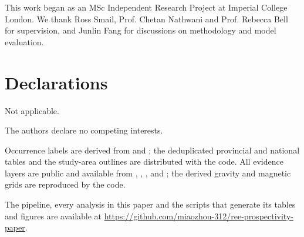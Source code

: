 \documentclass[pdflatex,sn-apa]{sn-jnl}
\begin{document}
\backmatter

This work began as an MSc Independent Research Project at Imperial College London. We thank Ross Smail, Prof. Chetan Nathwani and Prof. Rebecca Bell for supervision, and Junlin Fang for discussions on methodology and model evaluation.

\section*{Declarations}

Not applicable.

The authors declare no competing interests.

Occurrence labels are derived from \citet{Orris2018} and \citet{Parsa2024}; the deduplicated provincial and national tables and the study-area outlines are distributed with the code. All evidence layers are public and available from \citet{McCafferty2023}, \citet{Jobin2017}, \citet{Miles2016}, \citet{BradleyDC2008} and \citet{Wheeler1996}; the derived gravity and magnetic grids are reproduced by the code.

The pipeline, every analysis in this paper and the scripts that generate its tables and figures are available at \url{https://github.com/miaozhou-312/ree-prospectivity-paper}.
\end{document}
